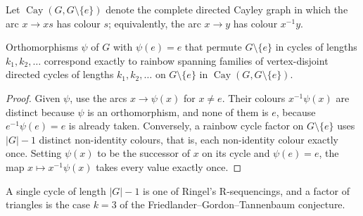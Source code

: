 
Let $\operatorname{Cay}(G,G\setminus\{e\})$ denote the complete directed Cayley graph in which the arc $x\to xs$ has colour $s$; equivalently, the arc $x\to y$ has colour $x^{-1}y$.

\begin{proposition}\label{prop:cyc}
Orthomorphisms $\psi$ of $G$ with $\psi(e)=e$ that permute $G\setminus\{e\}$ in cycles of lengths $k_1,k_2,\dots$ correspond exactly to rainbow spanning families of vertex-disjoint directed cycles of lengths $k_1,k_2,\dots$ on $G\setminus\{e\}$ in $\operatorname{Cay}(G,G\setminus\{e\})$.
\end{proposition}

\begin{proof}
Given $\psi$, use the arcs $x\to\psi(x)$ for $x\neq e$. Their colours $x^{-1}\psi(x)$ are distinct because $\psi$ is an orthomorphism, and none of them is $e$, because $e^{-1}\psi(e)=e$ is already taken. Conversely, a rainbow cycle factor on $G\setminus\{e\}$ uses $|G|-1$ distinct non-identity colours, that is, each non-identity colour exactly once. Setting $\psi(x)$ to be the successor of $x$ on its cycle and $\psi(e)=e$, the map $x\mapsto x^{-1}\psi(x)$ takes every value exactly once.
\end{proof}

A single cycle of length $|G|-1$ is one of Ringel's R-sequencings, and a factor of triangles is the case $k=3$ of the Friedlander--Gordon--Tannenbaum conjecture.
